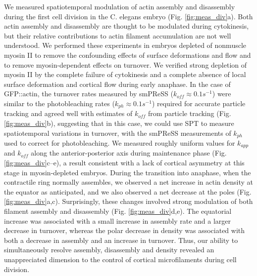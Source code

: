 We measured spatiotemporal modulation of actin assembly and disassembly during the first cell division in the C. elegans embryo (Fig. \ref{fig:meas_div}a). Both actin assembly and disassembly are thought to be modulated during cytokinesis, but their relative contributions to actin filament accumulation are not well understood. We performed these experiments in embryos depleted of nonmuscle myosin II to remove the confounding effects of surface deformations and flow and to remove myosin-dependent effects on turnover. We verified strong depletion of myosin II by the complete failure of cytokinesis and a complete absence of local surface deformation and cortical flow during early anaphase. In the case of GFP::actin, the turnover rates measured by smPReSS ($k_{off} \approx 0.1 s^{−1}$) were similar to the photobleaching rates ($k_{ph} \approx 0.1 s^{−1}$) required for accurate particle tracking and agreed well with estimates of $k_{off}$ from particle tracking (Fig. \ref{fig:meas_div}b), suggesting that in this case, we could use SPT to measure spatiotemporal variations in turnover, with the smPReSS measurements of $k_{ph}$ used to correct for photobleaching. We measured roughly uniform values for $k_{app}$ and $k_{off}$ along the anterior-posterior axis during maintenance phase (Fig. \ref{fig:meas_div}c–e), a result consistent with a lack of cortical asymmetry at this stage in myosin-depleted embryos. During the transition into anaphase, when the contractile ring normally assembles, we observed a net increase in actin density at the equator as anticipated, and we also observed a net decrease at the poles (Fig. \ref{fig:meas_div}a,c). Surprisingly, these changes involved strong modulation of both filament assembly and disassembly (Fig. \ref{fig:meas_div}d,e). The equatorial increase was associated with a small increase in assembly rate and a larger decrease in turnover, whereas the polar decrease in density was associated with both a decrease in assembly and an increase in turnover. Thus, our ability to simultaneously resolve assembly, disassembly and density revealed an unappreciated dimension to the control of cortical microfilaments during cell division.

